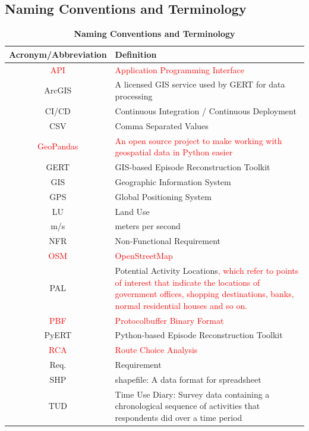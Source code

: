 \documentclass[12pt, titlepage]{article}
\begin{document}
\subsection{Naming Conventions and Terminology}
\begin{table}[h]
\centering
\begin{tabular}{|c|p{10cm}|}
 \hline
 {\bf Acronym/Abbreviation} & {\bf Definition} \\
 \hline
 \textcolor{red}{API} & \textcolor{red}{Application Programming Interface} \\
 \hline
 ArcGIS & A licensed GIS service used by GERT for data processing \\
 \hline
 CI/CD & Continuous Integration / Continuous Deployment\\
 \hline
 CSV & Comma Separated Values \\
 \hline
 \textcolor{red}{GeoPandas} & \textcolor{red}{An open source project to make working with geospatial data in Python easier}\\
 \hline
 GERT & GIS-based Episode Reconstruction Toolkit  \\ 
 \hline
 GIS & Geographic Information System \\
 \hline
 GPS & Global Positioning System \\
 \hline
 LU & Land Use \\ 
 \hline
 m/s & meters per second\\
 \hline
 NFR & Non-Functional Requirement  \\
 \hline
 \textcolor{red}{OSM} & \textcolor{red}{OpenStreetMap} \\
 \hline 
 PAL & Potential Activity Locations\textcolor{red}{, which refer to points of interest that indicate the locations of government offices, shopping destinations, banks, normal residential houses and so on.} \\ 
 \hline
 \textcolor{red}{PBF} & \textcolor{red}{Protocolbuffer Binary Format} \\
 \hline
 PyERT & Python-based Episode Reconstruction Toolkit  \\ 
 \hline
 \textcolor{red}{RCA} & \textcolor{red}{Route Choice Analysis} \\
 \hline
 Req. & Requirement  \\
 \hline
 SHP & shapefile: A data format for spreadsheet \\ 
 \hline
 TUD & Time Use Diary:  Survey data containing a chronological sequence of activities that respondents did over a time period\\
 \hline
\end{tabular}
\caption{\bf Naming Conventions and Terminology}
\end{table}
\end{document}
